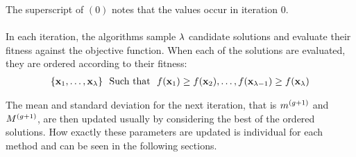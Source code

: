 The superscript of $(0)$ notes that the values occur in iteration 0.\\
\\
In each iteration, the algorithms sample $\lambda$ candidate solutions 
and evaluate their fitness
against the objective function. When each of the solutions are evaluated,
they are ordered according to their fitness:
\begin{align}
\{\textbf{\individual }_{1}, \hdots, 
\textbf{\individual }_{\populationSize }\}\ \ \text{Such that}\ \ 
\fitnessFunction(\textbf{x}_1) \geq 
\fitnessFunction(\textbf{\individual }_2), \hdots, 
\fitnessFunction(\textbf{\individual }_{\populationSize  - 1}) \geq 
\fitnessFunction(\textbf{\individual }_{\populationSize })
\end{align}

The mean and standard deviation for the next iteration, 
that is $m^{(g+1)}$ and $M^{(g+1)}$, are
then updated usually by considering the best of the ordered solutions. How exactly
these parameters are updated is individual for each method and can be seen in the following
sections.


